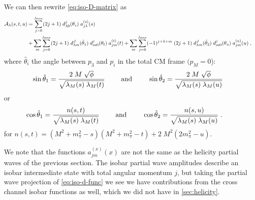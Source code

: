 We can then rewrite \cref{eq:iso-D-matrix} as
\begin{align}
  \label{eq:iso-d-func}
   \mathcal{A}_\lambda(s,t,u) &= \sum_{j = 0}^{{j_\text{max}}} (2 j+1) \; d_{\lambda0}^j(\theta_s) \; a_{j \lambda}^{(s)}(s)
    \nonumber \\
   &+ \sum_{m} \sum_{j = 0}^{{j_\text{max}}} (2j+1) \;
    d^{J}_{\lambda m}(\hat{\theta}_1)
    \;d_{m0}^j(\theta_t) \; a_{j m}^{(t)}(t)
   + \sum_{m} \sum_{j = 0}^{{j_\text{max}}} (-1)^{j + \lambda + m} \; (2j+1) \;
    d^{J}_{\lambda m}(\hat{\theta}_2)
    \;d_{m0}^j(\theta_u) \; a_{j m}^{(u)}(u) \; ,
  \end{align}
where \(\hat{\theta}_i\) the angle between \(p_3\) and \(p_i\) in the total CM frame \((p_M = 0\)):
  \begin{align}
    \sin\hat{\theta}_1 = \frac{
    2 \; M \; \sqrt{\phi}
    }{
    \sqrt{\lambda_M(s) \;  \lambda_M(t)}
    }
    \qquad \text{ and } \qquad
    \sin\hat{\theta}_2 = \frac{
    2 \; M \; \sqrt{\phi}
    }{
    \sqrt{\lambda_M(s) \;  \lambda_M(u)}
    }
  \end{align}
or
  \begin{align}
    \cos\hat{\theta}_1 &= \frac{n(s,t)}
    {\sqrt{\lambda_M(s) \; \lambda_M(t)}} \qquad \text{ and } \qquad
    \cos\hat{\theta}_2 = \frac{n(s,u)}
    {\sqrt{\lambda_M(s) \; \lambda_M(u)}} \; .
  \end{align}
for \(n(s,t) = (M^2 + m_\pi^2 - s)(M^2 + m_\pi^2 - t) + 2 \; M^2 (2m_\pi^2 - u)\).

 We note that the functions \(a^{(x)}_{jm}(x)\) are not the same as the helicity partial waves of the previous section. The isobar partial wave amplitudes describe an isobar intermediate state with total angular momentum \(j\), but taking the partial wave projection of \cref{eq:iso-d-func} we see we have contributions from the cross channel isobar functions as well, which we did not have in \cref{sec:helicity}.

